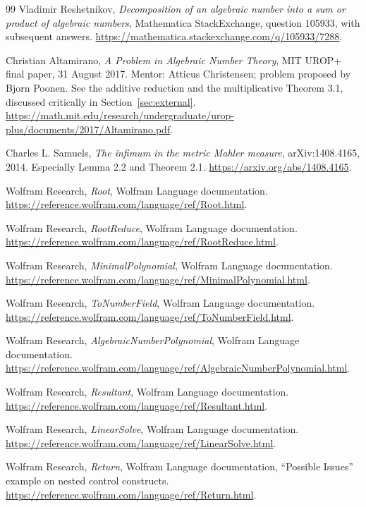 \documentclass[11pt,a4paper]{article}
\theoremstyle{definition}\newtheorem{definition}[theorem]{Definition}
\theoremstyle{remark}\newtheorem{remark}[theorem]{Remark}
\begin{document}
\begin{thebibliography}{99}
Vladimir Reshetnikov, \emph{Decomposition of an algebraic number into a sum
or product of algebraic numbers}, Mathematica StackExchange, question
105933, with subsequent answers.
\url{https://mathematica.stackexchange.com/q/105933/7288}.

Christian Altamirano, \emph{A Problem in Algebraic Number Theory}, MIT
UROP+ final paper, 31 August 2017. Mentor: Atticus Christensen; problem
proposed by Bjorn Poonen. See the additive reduction and the multiplicative
Theorem 3.1, discussed critically in Section~\ref{sec:external}.
\url{https://math.mit.edu/research/undergraduate/urop-plus/documents/2017/Altamirano.pdf}.

Charles L. Samuels, \emph{The infimum in the metric Mahler measure},
arXiv:1408.4165, 2014. Especially Lemma 2.2 and Theorem 2.1.
\url{https://arxiv.org/abs/1408.4165}.

Wolfram Research, \emph{Root}, Wolfram Language documentation.
\url{https://reference.wolfram.com/language/ref/Root.html}.

Wolfram Research, \emph{RootReduce}, Wolfram Language documentation.
\url{https://reference.wolfram.com/language/ref/RootReduce.html}.

Wolfram Research, \emph{MinimalPolynomial}, Wolfram Language documentation.
\url{https://reference.wolfram.com/language/ref/MinimalPolynomial.html}.

Wolfram Research, \emph{ToNumberField}, Wolfram Language documentation.
\url{https://reference.wolfram.com/language/ref/ToNumberField.html}.

Wolfram Research, \emph{AlgebraicNumberPolynomial}, Wolfram Language documentation.
\url{https://reference.wolfram.com/language/ref/AlgebraicNumberPolynomial.html}.

Wolfram Research, \emph{Resultant}, Wolfram Language documentation.
\url{https://reference.wolfram.com/language/ref/Resultant.html}.

Wolfram Research, \emph{LinearSolve}, Wolfram Language documentation.
\url{https://reference.wolfram.com/language/ref/LinearSolve.html}.

Wolfram Research, \emph{Return}, Wolfram Language documentation,
``Possible Issues'' example on nested control constructs.
\url{https://reference.wolfram.com/language/ref/Return.html}.
\end{thebibliography}
\end{document}
